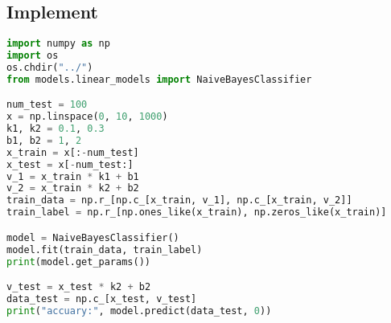\documentclass{report}
\begin{document}
\subsection{Implement}
\begin{lstlisting}[language={python}]
import numpy as np
import os
os.chdir("../")
from models.linear_models import NaiveBayesClassifier

num_test = 100
x = np.linspace(0, 10, 1000)
k1, k2 = 0.1, 0.3
b1, b2 = 1, 2
x_train = x[:-num_test]
x_test = x[-num_test:]
v_1 = x_train * k1 + b1
v_2 = x_train * k2 + b2
train_data = np.r_[np.c_[x_train, v_1], np.c_[x_train, v_2]]
train_label = np.r_[np.ones_like(x_train), np.zeros_like(x_train)]

model = NaiveBayesClassifier()
model.fit(train_data, train_label)
print(model.get_params())

v_test = x_test * k2 + b2
data_test = np.c_[x_test, v_test]
print("accuary:", model.predict(data_test, 0))
\end{lstlisting}
\end{document}
